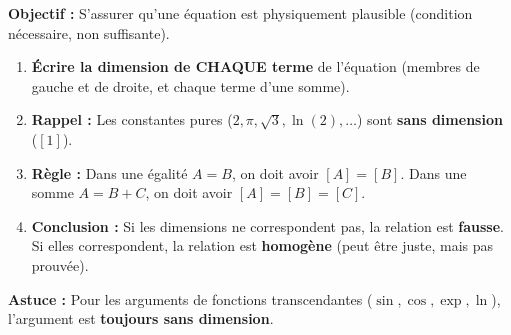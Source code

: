 \documentclass[11pt]{article}
\begin{document}
\begin{methode}
    \textbf{Objectif :} S'assurer qu'une équation est physiquement plausible (condition nécessaire, non suffisante).
    \begin{enumerate}
        \item \textbf{Écrire la dimension de CHAQUE terme} de l'équation (membres de gauche et de droite, et chaque terme d'une somme).
        \item \textbf{Rappel :} Les constantes pures ($2, \pi, \sqrt{3}, \ln(2), \dots$) sont \textbf{sans dimension} ($[1]$).
        \item \textbf{Règle :} Dans une égalité $A = B$, on doit avoir $[A] = [B]$. Dans une somme $A = B + C$, on doit avoir $[A] = [B] = [C]$.
        \item \textbf{Conclusion :} Si les dimensions ne correspondent pas, la relation est \textbf{fausse}. Si elles correspondent, la relation est \textbf{homogène} (peut être juste, mais pas prouvée).
    \end{enumerate}
    \textbf{Astuce :} Pour les arguments de fonctions transcendantes ($\sin, \cos, \exp, \ln$), l'argument est \textbf{toujours sans dimension}.
\end{methode}
\end{document}
